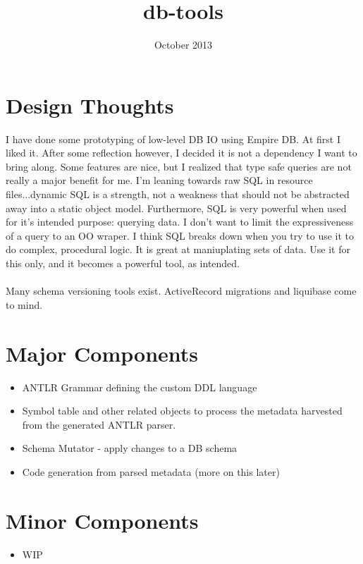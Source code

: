 \documentclass[10pt]{article}
\title{db-tools}
\date{October 2013}
\begin{document}
 \maketitle

\section*{Design Thoughts}

I have done some prototyping of low-level DB IO using Empire DB. At
first I liked it. After some reflection however, I decided it is not a 
dependency I want to bring along. Some features are nice, but I
realized that 
type safe
queries are not really a major benefit for me. I'm leaning towards raw SQL in
resource files...dynamic SQL is a strength, not a weakness that should
not be abstracted away into a static object model.
Furthermore, SQL is very powerful when used for it's intended purpose: querying
data. I don't want to limit the expressiveness of a query to an OO
wraper. I think SQL breaks down when you try to use it to do complex,
procedural logic. It is great at maniuplating sets of data. Use it for
this only, and it becomes a powerful tool, as intended. 
\\
\\
Many schema versioning tools exist. ActiveRecord migrations and
liquibase come to mind.
%
%

\section*{Major Components}
\begin{itemize}
  \item ANTLR Grammar defining the custom DDL language
  \item Symbol table and other related objects to process the metadata
   harvested from the generated ANTLR parser.
   \item Schema Mutator - apply changes to a DB schema
 \item Code generation from parsed metadata (more on this later)
 
 \end{itemize}

\section*{Minor Components}
\begin {itemize}
\item WIP
\end{itemize}
\end{document}
